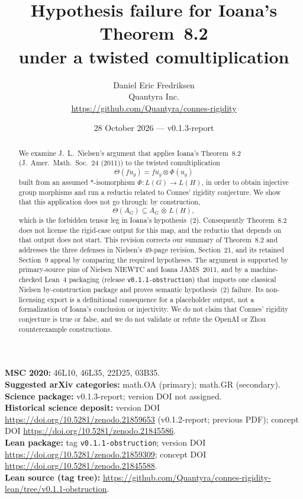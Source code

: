 \documentclass[11pt]{article}
\title{Hypothesis failure for Ioana's Theorem~8.2\\
under a twisted comultiplication}
\author{Daniel Eric Fredriksen\\
Quantyra Inc.\\
\url{https://github.com/Quantyra/connes-rigidity}}
\date{28 October 2026 --- v0.1.3-report}
\begin{document}
\maketitle

\begin{abstract}
We examine J.~L.~Nielsen's argument that applies Ioana's Theorem~8.2
(J.~Amer.\ Math.\ Soc.\ 24 (2011)) to the twisted comultiplication
\[
\Theta(f u_g)=f u_g\otimes\Phi(u_g)
\]
built from an assumed $*$-isomorphism $\Phi\colon L(G)\to L(H)$, in order
to obtain injective group morphisms and run a reductio related to Connes'
rigidity conjecture. We show that this application does not go through: by
construction,
\[
\Theta(A_G)\subseteq A_G\,\bar\otimes\, L(H),
\]
which is the forbidden tensor leg in Ioana's hypothesis~(2). Consequently
Theorem~8.2 does not license the rigid-case output for this map, and the
reductio that depends on that output does not start. This revision corrects our summary of Theorem~8.2 and addresses the three
defenses in Nielsen's 49-page revision, Section~21, and its retained
Section~9 appeal by comparing the required hypotheses. The argument is
supported by primary-source pins of Nielsen NIEWTC and Ioana JAMS~2011, and
by a machine-checked Lean~4 packaging (release
\texttt{v0.1.1-obstruction}) that imports one classical Nielsen
by-construction package and proves semantic hypothesis~(2) failure. Its
non-licensing export is a definitional consequence for a placeholder output,
not a formalization of Ioana's conclusion or injectivity. We do not claim that
Connes' rigidity conjecture is true or false, and we do not validate or
refute the OpenAI or Zhou counterexample constructions.
\end{abstract}

\noindent\textbf{MSC 2020:} 46L10, 46L35, 22D25, 03B35.\\
\textbf{Suggested arXiv categories:} math.OA (primary); math.GR (secondary).\\
\textbf{Science package:} v0.1.3-report; version DOI not assigned.\\
\textbf{Historical science deposit:} version DOI
\url{https://doi.org/10.5281/zenodo.21859653}
(v0.1.2-report; previous PDF);
concept DOI \url{https://doi.org/10.5281/zenodo.21845586}.\\
\textbf{Lean package:} tag \texttt{v0.1.1-obstruction}; version DOI
\url{https://doi.org/10.5281/zenodo.21859309};
concept DOI \url{https://doi.org/10.5281/zenodo.21845588}.\\
\textbf{Lean source (tag tree):}
\url{https://github.com/Quantyra/connes-rigidity-lean/tree/v0.1.1-obstruction}.
\end{document}
